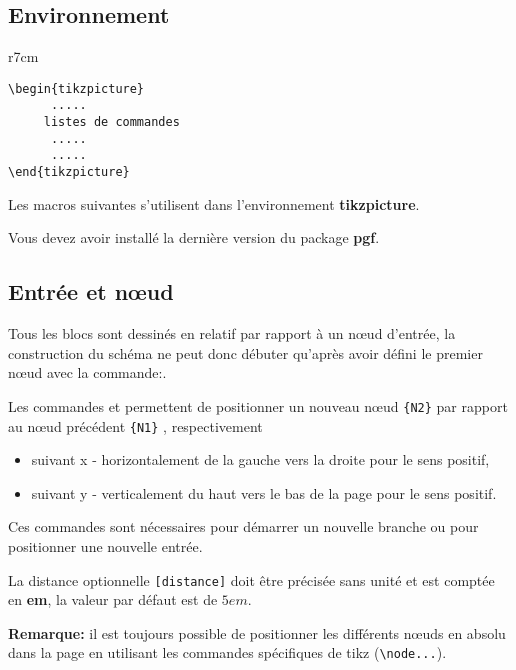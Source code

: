 \documentclass[a4paper,11pt]{article}                      %
\begin{document}
\subsection{Environnement}

\begin{wrapfigure}[8]{r}{7cm}
\centering
\begin{verbatim}
\begin{tikzpicture}
      .....
     listes de commandes
      .....
      .....
\end{tikzpicture}
\end{verbatim}
\caption{Environnement tikzpicture}
\label{fig:envirTikz}
\end{wrapfigure}

Les macros suivantes s'utilisent dans l'environnement \textbf{tikzpicture}.

Vous devez avoir installé la dernière version du package \textbf{pgf}.




\subsection{Entrée et n\oe ud}

Tous les blocs sont dessinés en relatif par rapport à un n\oe ud d'entrée, la construction du schéma ne peut donc débuter qu'après avoir défini le premier n\oe ud avec la commande:.



Les commandes   et  permettent de positionner un nouveau n\oe ud \verb"{N2}" par rapport au n\oe ud précédent \verb"{N1}" , respectivement 
\begin{itemize}
\item suivant x - horizontalement de la gauche vers la droite pour le sens positif,
\item suivant y - verticalement du haut vers le bas de la page pour le sens positif.
\end{itemize}

Ces commandes sont nécessaires pour démarrer un nouvelle branche ou pour positionner une nouvelle entrée.

La distance optionnelle \verb"[distance]"  doit être précisée sans unité et est comptée en \textbf{em}, la valeur par défaut est de $5em$.

\textbf{Remarque:}  il est toujours possible de positionner les différents n\oe uds en absolu dans la page en utilisant les commandes spécifiques de tikz (\verb"\node...").
\end{document}
